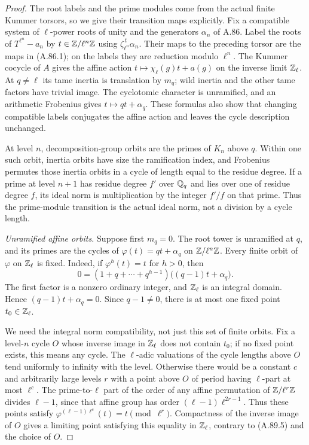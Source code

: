 \begin{proof}
The root labels and the prime modules come from the actual
finite Kummer torsors, so we give their transition maps explicitly.
Fix a compatible system of $\ell$-power roots of unity and
the generators $\alpha_n$ of A.86.  Label the roots of
$T^{\ell^n}-a_n$ by $t\in\mathbb Z/\ell^n\mathbb Z$ using
$\zeta_{\ell^n}^{\,t}\alpha_n$.
Their maps to the preceding torsor are the maps in (A.86.1);
on the labels they are reduction modulo $\ell^n$.
The Kummer cocycle of $A$ gives the affine action
$t\mapsto\chi_\ell(g)t+a(g)$ on the inverse limit
$\mathbb Z_\ell$.
At $q\ne\ell$ its tame inertia is translation by $m_q$;
wild inertia and the other tame factors have trivial image.
The cyclotomic character is unramified, and an arithmetic
Frobenius gives $t\mapsto qt+\alpha_q$.
These formulas also show that changing compatible labels
conjugates the affine action and leaves the cycle description
unchanged.

At level $n$, decomposition-group orbits are the primes of
$K_n$ above $q$.  Within one such orbit, inertia orbits have
size the ramification index, and Frobenius permutes those
inertia orbits in a cycle of length equal to the residue degree.
If a prime at level $n+1$ has residue degree $f'$ over
$\mathbb Q_q$ and lies over one of residue degree $f$, its ideal
norm is multiplication by the integer $f'/f$ on that prime.
Thus the prime-module transition is the actual ideal norm,
not a division by a cycle length.

\emph{Unramified affine orbits.}
Suppose first $m_q=0$.
The root tower is unramified at $q$, and its primes are the
cycles of $\varphi(t)=qt+\alpha_q$ on $\mathbb Z/\ell^n\mathbb Z$.
Every finite orbit of $\varphi$ on $\mathbb Z_\ell$ is fixed.
Indeed, if $\varphi^h(t)=t$ for $h>0$, then
\[
 0=(1+q+\cdots+q^{h-1})\bigl((q-1)t+\alpha_q\bigr).
 \tag{A.89.5}
\]
The first factor is a nonzero ordinary integer, and $\mathbb Z_\ell$
is an integral domain.  Hence $(q-1)t+\alpha_q=0$.
Since $q-1\ne0$, there is at most one fixed point
$t_0\in\mathbb Z_\ell$.

We need the integral norm compatibility, not just this set of
finite orbits.  Fix a level-$n$ cycle $O$ whose inverse image
in $\mathbb Z_\ell$ does not contain $t_0$; if no fixed point exists,
this means any cycle.  The $\ell$-adic valuations of the
cycle lengths above $O$ tend uniformly to infinity with the
level.  Otherwise there would be a constant $c$ and arbitrarily
large levels $r$ with a point above $O$ of period having
$\ell$-part at most $\ell^c$.
The prime-to-$\ell$ part of the order of any affine permutation
of $\mathbb Z/\ell^r\mathbb Z$ divides $\ell-1$, since that affine group has
order $(\ell-1)\ell^{2r-1}$.
Thus these points satisfy
$\varphi^{(\ell-1)\ell^c}(t)=t\pmod{\ell^r}$.
Compactness of the inverse image of $O$ gives a limiting
point satisfying this equality in $\mathbb Z_\ell$, contrary to
(A.89.5) and the choice of $O$.


\end{proof}
